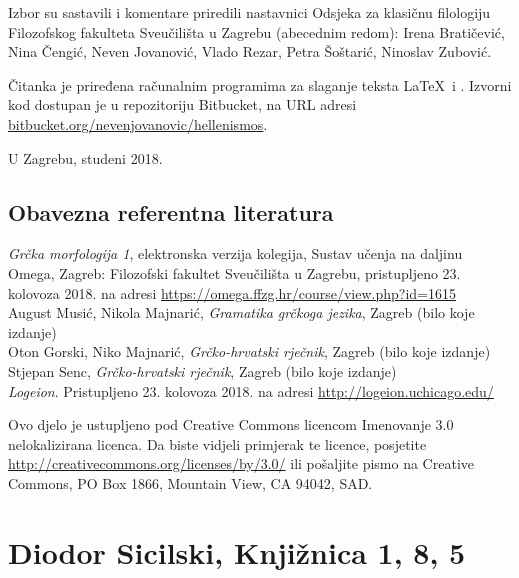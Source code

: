 \documentclass[a4paper,12pt,twoside]{report}
\begin{document}
\newpage

Izbor su sastavili i komentare priredili nastavnici Odsjeka za klasičnu filologiju Filozofskog fakulteta Sveučilišta u Zagrebu (abecednim redom): Irena Bratičević, Nina Čengić, Neven Jovanović, Vlado Rezar, Petra Šoštarić, Ninoslav Zubović.

Čitanka je priređena računalnim programima za slaganje teksta \LaTeX\ i \XeLaTeX. Izvorni kod dostupan je u repozitoriju Bitbucket, na URL adresi \href{https://bitbucket.org/nevenjovanovic/hellenismos}{bitbucket.org/nevenjovanovic/hellenismos}.

\medskip

U Zagrebu, studeni 2018.

\section*{Obavezna referentna literatura}

\textit{Grčka morfologija 1}, elektronska verzija kolegija, Sustav učenja na daljinu Omega, Zagreb: Filozofski fakultet Sveučilišta u Zagrebu, pristupljeno 23. kolovoza 2018. na adresi \url{https://omega.ffzg.hr/course/view.php?id=1615}\\
August Musić, Nikola Majnarić, \textit{Gramatika grčkoga jezika}, Zagreb (bilo koje izdanje)\\
Oton Gorski, Niko Majnarić, \textit{Grčko-hrvatski rječnik}, Zagreb (bilo koje izdanje)\\
Stjepan Senc, \textit{Grčko-hrvatski rječnik}, Zagreb (bilo koje izdanje)\\
\textit{Logeion}. Pristupljeno 23. kolovoza 2018. na adresi \url{http://logeion.uchicago.edu/}\\


\vspace*{\fill}

\noindent Ovo djelo je ustupljeno pod Creative Commons licencom Imenovanje 3.0 nelokalizirana licenca. Da biste vidjeli primjerak te licence, posjetite \url{http://creativecommons.org/licenses/by/3.0/} ili pošaljite pismo na Creative Commons, PO Box 1866, Mountain View, CA 94042, SAD.

\newpage




\setcounter{chapter}{40}

\chapter{Diodor Sicilski, Knjižnica 1, 8, 5}
\end{document}
